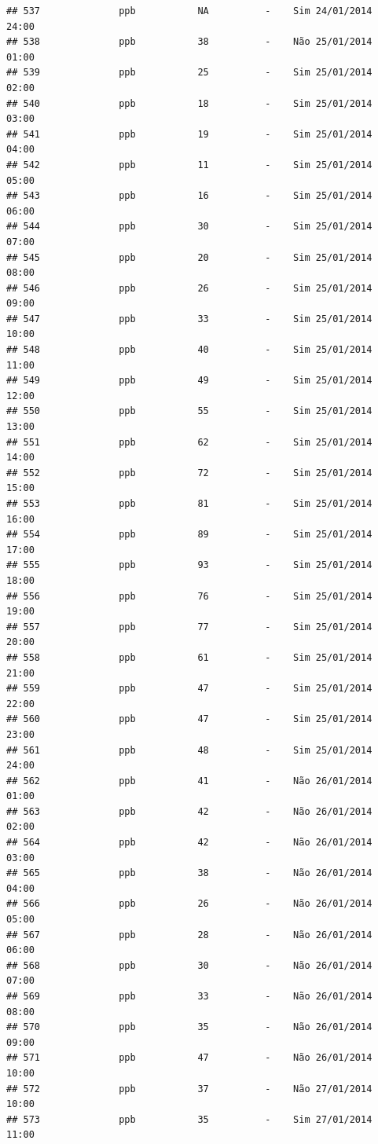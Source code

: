 \documentclass[]{book}
\begin{document}
\begin{verbatim}
## 537              ppb           NA          -    Sim 24/01/2014 24:00
## 538              ppb           38          -    Não 25/01/2014 01:00
## 539              ppb           25          -    Sim 25/01/2014 02:00
## 540              ppb           18          -    Sim 25/01/2014 03:00
## 541              ppb           19          -    Sim 25/01/2014 04:00
## 542              ppb           11          -    Sim 25/01/2014 05:00
## 543              ppb           16          -    Sim 25/01/2014 06:00
## 544              ppb           30          -    Sim 25/01/2014 07:00
## 545              ppb           20          -    Sim 25/01/2014 08:00
## 546              ppb           26          -    Sim 25/01/2014 09:00
## 547              ppb           33          -    Sim 25/01/2014 10:00
## 548              ppb           40          -    Sim 25/01/2014 11:00
## 549              ppb           49          -    Sim 25/01/2014 12:00
## 550              ppb           55          -    Sim 25/01/2014 13:00
## 551              ppb           62          -    Sim 25/01/2014 14:00
## 552              ppb           72          -    Sim 25/01/2014 15:00
## 553              ppb           81          -    Sim 25/01/2014 16:00
## 554              ppb           89          -    Sim 25/01/2014 17:00
## 555              ppb           93          -    Sim 25/01/2014 18:00
## 556              ppb           76          -    Sim 25/01/2014 19:00
## 557              ppb           77          -    Sim 25/01/2014 20:00
## 558              ppb           61          -    Sim 25/01/2014 21:00
## 559              ppb           47          -    Sim 25/01/2014 22:00
## 560              ppb           47          -    Sim 25/01/2014 23:00
## 561              ppb           48          -    Sim 25/01/2014 24:00
## 562              ppb           41          -    Não 26/01/2014 01:00
## 563              ppb           42          -    Não 26/01/2014 02:00
## 564              ppb           42          -    Não 26/01/2014 03:00
## 565              ppb           38          -    Não 26/01/2014 04:00
## 566              ppb           26          -    Não 26/01/2014 05:00
## 567              ppb           28          -    Não 26/01/2014 06:00
## 568              ppb           30          -    Não 26/01/2014 07:00
## 569              ppb           33          -    Não 26/01/2014 08:00
## 570              ppb           35          -    Não 26/01/2014 09:00
## 571              ppb           47          -    Não 26/01/2014 10:00
## 572              ppb           37          -    Não 27/01/2014 10:00
## 573              ppb           35          -    Sim 27/01/2014 11:00

\end{verbatim}
\end{document}
